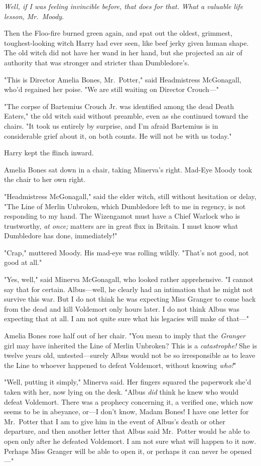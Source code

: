 \emph{Well, if I was feeling invincible before, that does for that. What a
valuable life lesson, Mr.~Moody.}

Then the Floo-fire burned green again, and spat out the oldest, grimmest,
toughest-looking witch Harry had ever seen, like beef jerky given human shape.
The old witch did not have her wand in her hand, but she projected an air of
authority that was stronger and stricter than Dumbledore's.

"This is Director Amelia Bones, Mr.~Potter," said Headmistress McGonagall,
who'd regained her poise. "We are still waiting on Director Crouch---"

"The corpse of Bartemius Crouch Jr. was identified among the dead Death
Eaters," the old witch said without preamble, even as she continued toward the
chairs. "It took us entirely by surprise, and I'm afraid Bartemius is in
considerable grief about it, on both counts. He will not be with us today."

Harry kept the flinch inward.

Amelia Bones sat down in a chair, taking Minerva's right. Mad-Eye Moody took
the chair to her own right.

"Headmistress McGonagall," said the elder witch, still without hesitation or
delay, "The Line of Merlin Unbroken, which Dumbledore left to me in regency, is
not responding to my hand. The Wizengamot must have a Chief Warlock who is
trustworthy, \emph{at once;} matters are in great flux in Britain. I must know
what Dumbledore has done, immediately!"

"Crap," muttered Moody. His mad-eye was rolling wildly. "That's not good, not
good at all."

"Yes, well," said Minerva McGonagall, who looked rather apprehensive. "I cannot
say that for certain. Albus---well, he clearly had an intimation that he might
not survive this war. But I do not think he was expecting Miss Granger to come
back from the dead and kill Voldemort only hours later. I do not think Albus
was expecting that at all. I am not quite sure what his legacies will make of
that---"

Amelia Bones rose half out of her chair. "You mean to imply that the
\emph{Granger} girl may have inherited the Line of Merlin Unbroken? This is a
\emph{catastrophe!} She is twelve years old, untested---surely Albus would not
be so irresponsible as to leave the Line to whoever happened to defeat
Voldemort, without knowing \emph{who!}"

"Well, putting it simply," Minerva said. Her fingers squared the paperwork
she'd taken with her, now lying on the desk. "Albus \emph{did} think he knew
who would defeat Voldemort. There was a prophecy concerning it, a verified one,
which now seems to be in abeyance, or---I don't know, Madam Bones! I have one
letter for Mr.~Potter that I am to give him in the event of Albus's death or
other departure, and then another letter that Albus said Mr.~Potter would be
able to open only after he defeated Voldemort. I am not sure what will happen
to it now. Perhaps Miss Granger will be able to open it, or perhaps it can
never be opened---"

